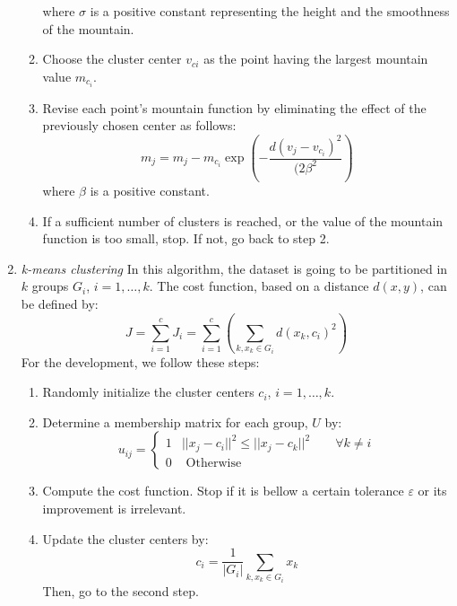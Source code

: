 \documentclass[conference]{IEEEtran}
\begin{document}
\begin{enumerate}
\begin{enumerate}
    where $\sigma$ is a positive constant representing the height and the smoothness of the mountain. 
    \item Choose the cluster center $v_{ci}$ as the point having the largest mountain value $m_{c_i}$. 
    \item Revise each point's mountain function by eliminating the effect of the previously chosen center as follows:
\begin{equation*}
    m_j = m_j - m_{c_i}\exp\left(-\frac{d(v_j-v_{c_i})^2}{(2\beta^2}\right)
\end{equation*}
where $\beta$ is a positive constant.
\item If a sufficient number of clusters is reached, or the value of the mountain function is too small, stop. If not, go back to step 2.
    \end{enumerate}
    \item \textit{k-means clustering} In this algorithm, the dataset is going to be partitioned in $k$ groups $G_i$, $i = 1,\dots,k$. The cost function, based on a distance $d(x,y)$, can be defined by:
    \begin{equation*}
        J = \sum_{i=1}^c J_i = \sum_{i=1}^c\left(\sum_{k,x_k\in G_i} d(x_k,c_i)^2\right)
    \end{equation*}
    For the development, we follow these steps:
    \begin{enumerate}
        \item Randomly initialize the cluster centers $c_i$, $i = 1,\dots, k$.
        \item Determine a membership matrix for each group, $U$ by:
        \begin{equation*}
            u_{ij} = \left\lbrace\begin{array}{ll}
            1     & ||x_j - c_i||^2 \leq ||x_j - c_k||^2 \qquad \forall k\neq i \\
             0    & \text{ Otherwise} 
            \end{array}\right.
        \end{equation*}
        \item Compute the cost function. Stop if it is bellow a certain tolerance $\varepsilon$ or its improvement is irrelevant.
        \item Update the cluster centers by:
        \begin{equation*}
            c_i = \frac{1}{|G_i|}\sum_{k, x_k\in G_i}x_k
        \end{equation*}
        Then, go to the second step.
    \end{enumerate}

\end{enumerate}
\end{document}
